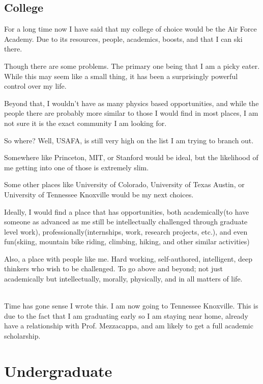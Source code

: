 \subsection{College}
\par For a long time now I have said that my college of choice would be the Air Force Academy. Due to its resources, people, academics, boosts, and that I can ski there.
\par Though there are some problems. The primary one being that I am a picky eater. While this may seem like a small thing, it has been a surprisingly powerful control over my life.
\par Beyond that, I wouldn't have as many physics based opportunities, and while the people there are probably more similar to those I would find in most places, I am not sure it is the exact community I am looking for.
\par So where? Well, USAFA, is still very high on the list I am trying to branch out.
\par Somewhere like Princeton, MIT, or Stanford would be ideal, but the likelihood of me getting into one of those is extremely slim.
\par Some other places like University of Colorado, University of Texas Austin, or University of Tennessee Knoxville would be my next choices.
\\
\par Ideally, I would find a place that has opportunities, both academically(to have someone as advanced as me still be intellectually challenged through graduate level work), professionally(internships, work, research projects, etc.), and even fun(skiing, mountain bike riding, climbing, hiking, and other similar activities)
\par Also, a place with people like me. Hard working, self-authored, intelligent, deep thinkers who wish to be challenged. To go above and beyond; not just academically but intellectually, morally, physically, and in all matters of life.
\\
\\
\par Time has gone sense I wrote this. I am now going to Tennessee Knoxville. This is due to the fact that I am graduating early so I am staying near home, already have a relationship with Prof. Mezzacappa, and am likely to get a full academic scholarship.

\section{Undergraduate}
